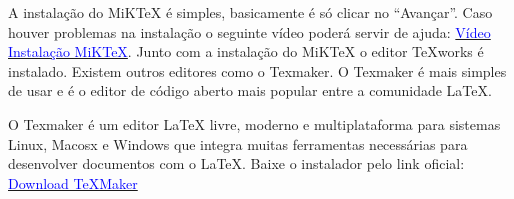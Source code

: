 A instalação do MiKTeX é simples, basicamente é só clicar no “Avançar”. Caso houver problemas na instalação o seguinte vídeo poderá servir de ajuda: \href{https://www.youtube.com/watch?v=4udFXbqtayE&list=LLQVoeslEpxQJ0UavpXUEkq}{\textcolor{blue}{Vídeo Instalação MiKTeX}}. Junto com a instalação do MiKTeX o editor TeXworks é instalado. Existem outros editores como o Texmaker. O Texmaker é mais simples de usar e é o editor de código aberto mais popular entre a comunidade LaTeX.

O Texmaker é um editor LaTeX livre, moderno e multiplataforma para sistemas Linux, Macosx e Windows que integra muitas ferramentas necessárias para desenvolver documentos com o LaTeX. Baixe o instalador pelo link oficial: \href{http://www.xm1math.net/texmaker/download.html}{\textcolor{blue}{Download TeXMaker}}  